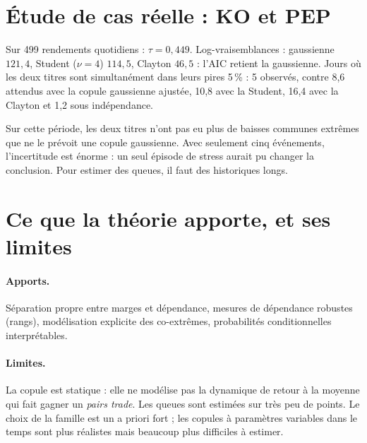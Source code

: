 \section{Étude de cas réelle : KO et PEP}

\begin{codebox}
Sur 499 rendements quotidiens : $\tau = 0{,}449$. Log-vraisemblances : gaussienne $121{,}4$, Student ($\nu = 4$) $114{,}5$, Clayton $46{,}5$ : l'AIC retient la gaussienne. Jours où les deux titres sont simultanément dans leurs pires 5\,\% : 5 observés, contre 8,6 attendus avec la copule gaussienne ajustée, 10,8 avec la Student, 16,4 avec la Clayton et 1,2 sous indépendance.
\end{codebox}

Sur cette période, les deux titres n'ont pas eu plus de baisses communes extrêmes que ne le prévoit une copule gaussienne. Avec seulement cinq événements, l'incertitude est énorme : un seul épisode de stress aurait pu changer la conclusion. Pour estimer des queues, il faut des historiques longs.

\section{Ce que la théorie apporte, et ses limites}

\paragraph{Apports.} Séparation propre entre marges et dépendance, mesures de dépendance robustes (rangs), modélisation explicite des co-extrêmes, probabilités conditionnelles interprétables.

\paragraph{Limites.} La copule est statique : elle ne modélise pas la dynamique de retour à la moyenne qui fait gagner un \emph{pairs trade}. Les queues sont estimées sur très peu de points. Le choix de la famille est un a priori fort ; les copules à paramètres variables dans le temps sont plus réalistes mais beaucoup plus difficiles à estimer.

